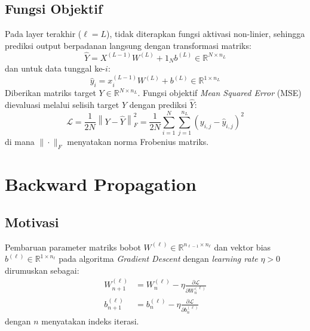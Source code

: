 \documentclass[11pt,a4paper]{article}
\def\mathbf#1{#1}%
\theoremstyle{plain}
\theoremstyle{definition}
\theoremstyle{remark}
\begin{document}
\subsection{Fungsi Objektif}
\label{subsec:fungsi_objektif}

Pada layer terakhir ($\ell = L$), tidak diterapkan fungsi aktivasi non-linier, sehingga prediksi output berpadanan langsung dengan transformasi matriks:
\begin{equation}
    \hat{Y} = X^{(L-1)} W^{(L)} + \mathbf{1}_N \mathbf{b}^{(L)} \in \mathbb{R}^{N \times n_L} \label{eq:output_pred_batch}
\end{equation}
dan untuk data tunggal ke-$i$:
\begin{equation}
    \hat{\mathbf{y}}_i = \mathbf{x}_i^{(L-1)} W^{(L)} + \mathbf{b}^{(L)} \in \mathbb{R}^{1 \times n_L} \label{eq:output_pred_single}
\end{equation}
Diberikan matriks target $Y \in \mathbb{R}^{N \times n_L}$. Fungsi objektif \textit{Mean Squared Error} (MSE) dievaluasi melalui selisih target $Y$ dengan prediksi $\hat{Y}$:
\begin{equation}
    \mathcal{L} = \frac{1}{2N} \left\| Y - \hat{Y} \right\|_F^2 = \frac{1}{2N} \sum_{i=1}^N \sum_{j=1}^{n_L} \left( y_{i, j} - \hat{y}_{i, j} \right)^2 \label{eq:loss_mse}
\end{equation}
di mana $\|\cdot\|_F$ menyatakan norma Frobenius matriks.

\clearpage
\section{Backward Propagation}
\label{sec:penurunan_gradien}
\enlargethispage{2\baselineskip}

\subsection{Motivasi}
\label{subsec:motivasi_gd}

Pembaruan parameter matriks bobot $W^{(\ell)} \in \mathbb{R}^{n_{\ell-1} \times n_\ell}$ dan vektor bias $\mathbf{b}^{(\ell)} \in \mathbb{R}^{1 \times n_\ell}$ pada algoritma \textit{Gradient Descent} dengan \textit{learning rate} $\eta > 0$ dirumuskan sebagai:
\begin{align}
    W^{(\ell)}_{n+1} &= W^{(\ell)}_n - \eta \frac{\partial \mathcal{L}}{\partial W^{(\ell)}_n} \label{eq:update_w} \\
    \mathbf{b}^{(\ell)}_{n+1} &= \mathbf{b}^{(\ell)}_n - \eta \frac{\partial \mathcal{L}}{\partial \mathbf{b}^{(\ell)}_n} \label{eq:update_b}
\end{align}
dengan $n$ menyatakan indeks iterasi.
\end{document}

